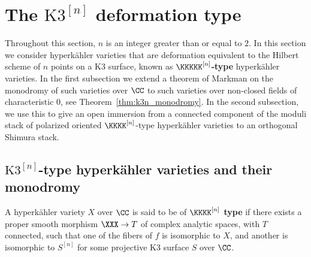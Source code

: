 %



\section{The $\text{K3}^{[n]}$ deformation type}\label{sec:k3n}
Throughout this section, $n$ is an integer greater than or equal to $2$. In this section we consider hyperk\"ahler varieties that are deformation equivalent to the Hilbert scheme of $n$ points on a K3 surface, known as {\bfseries $\KKKKK^{[n]}$-type} hyperk\"ahler varieties. In the first subsection we extend a theorem of Markman on the monodromy of such varieties over $\CC$ to such varieties over non-closed fields of characteristic $0$, see Theorem~\ref{thm:k3n_monodromy}. In the second subsection, we use this to give an open immersion from a connected component of the moduli stack of polarized oriented $\KKKK^{[n]}$-type hyperk\"ahler varieties to an orthogonal Shimura stack.

\subsection{$\text{K3}^{[n]}$-type hyperk\"ahler varieties and their monodromy}
\begin{definition}\label{def:k3n_1}
A hyperk\"ahler variety $X$ over $\CC$ is said to be of {\bfseries $\KKKK^{[n]}$ type} if there exists a proper smooth morphism $\XXX \rightarrow T$ of complex analytic spaces, with $T$ connected, such that one of the fibers of $f$ is isomorphic to $X$, and another is isomorphic to $S^{[n]}$ for some projective K3 surface $S$ over $\CC$.
\end{definition}

